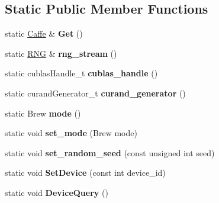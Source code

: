 \subsection*{Static Public Member Functions}
\begin{DoxyCompactItemize}
\item 
static \hyperlink{classcaffe_1_1Caffe}{Caffe} \& {\bfseries Get} ()\hypertarget{classcaffe_1_1Caffe_a169632a1735728f6bdaacbbe77b81804}{}\label{classcaffe_1_1Caffe_a169632a1735728f6bdaacbbe77b81804}

\item 
static \hyperlink{classcaffe_1_1Caffe_1_1RNG}{R\+NG} \& {\bfseries rng\+\_\+stream} ()\hypertarget{classcaffe_1_1Caffe_aff31f4285d99f4254e2af4e40678bf5e}{}\label{classcaffe_1_1Caffe_aff31f4285d99f4254e2af4e40678bf5e}

\item 
static cublas\+Handle\+\_\+t {\bfseries cublas\+\_\+handle} ()\hypertarget{classcaffe_1_1Caffe_afbba8bb2af70b628eca89269b81c915f}{}\label{classcaffe_1_1Caffe_afbba8bb2af70b628eca89269b81c915f}

\item 
static curand\+Generator\+\_\+t {\bfseries curand\+\_\+generator} ()\hypertarget{classcaffe_1_1Caffe_a659f92f48f20d95c46c6629574a26c0f}{}\label{classcaffe_1_1Caffe_a659f92f48f20d95c46c6629574a26c0f}

\item 
static Brew {\bfseries mode} ()\hypertarget{classcaffe_1_1Caffe_aa45214769b727ecd971e0d5ed8ffe96a}{}\label{classcaffe_1_1Caffe_aa45214769b727ecd971e0d5ed8ffe96a}

\item 
static void {\bfseries set\+\_\+mode} (Brew mode)\hypertarget{classcaffe_1_1Caffe_a025008ff5854ba15e62138c81b7a140d}{}\label{classcaffe_1_1Caffe_a025008ff5854ba15e62138c81b7a140d}

\item 
static void {\bfseries set\+\_\+random\+\_\+seed} (const unsigned int seed)\hypertarget{classcaffe_1_1Caffe_a1f6f560b0f9f73a596284908ee44ecc7}{}\label{classcaffe_1_1Caffe_a1f6f560b0f9f73a596284908ee44ecc7}

\item 
static void {\bfseries Set\+Device} (const int device\+\_\+id)\hypertarget{classcaffe_1_1Caffe_ac95c04832bf528acb3ae8f1ffa5b6c11}{}\label{classcaffe_1_1Caffe_ac95c04832bf528acb3ae8f1ffa5b6c11}

\item 
static void {\bfseries Device\+Query} ()\hypertarget{classcaffe_1_1Caffe_a4af30f25dc929f2b9c1f195e1683a411}{}\label{classcaffe_1_1Caffe_a4af30f25dc929f2b9c1f195e1683a411}


\end{DoxyCompactItemize}
